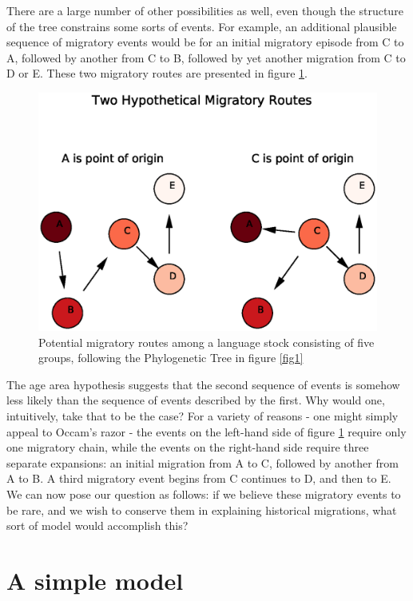 \documentclass[11pt]{article}
\begin{document}
There are a large number of other possibilities as well, even though the structure of the tree constrains some sorts of events. For example, an additional plausible sequence of migratory events would be for an initial migratory episode from C to A, followed by another from C to B, followed by yet another migration from C to D or E. These two migratory routes are presented in figure \ref{fig2}.

\begin{figure}
\begin{center}
\includegraphics[width=\textwidth]{simpleMR.eps}
\caption{Potential migratory routes among a language stock consisting of five groups, following the Phylogenetic Tree in figure \ref{fig1}}
\end{center} \label{fig2}
\end{figure}

The age area hypothesis suggests that the second sequence of events is somehow less likely than the sequence of events described by the first. Why would one, intuitively, take that to be the case? For a variety of reasons - one might simply appeal to Occam's razor - the events on the left-hand side of figure \ref{fig2} require only one migratory chain, while the events on the right-hand side require three separate expansions: an initial migration from A to C, followed by another from A to B. A third migratory event begins from C continues to D, and then to E. We can now pose our question as follows: if we believe these migratory events to be rare, and we wish to conserve them in explaining historical migrations, what sort of model would accomplish this?

\section{A simple model}
\end{document}
